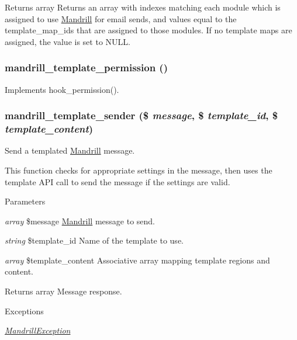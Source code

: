 \begin{DoxyReturn}{Returns}
array Returns an array with indexes matching each module which is assigned to use \hyperlink{classMandrill}{Mandrill} for email sends, and values equal to the template\_\-map\_\-ids that are assigned to those modules. If no template maps are assigned, the value is set to NULL. 
\end{DoxyReturn}
\hypertarget{mandrill__template_8module_ae1d3285f08ccd1416a34b0f0c5276c64}{
\subsubsection[{mandrill\_\-template\_\-permission}]{\setlength{\rightskip}{0pt plus 5cm}mandrill\_\-template\_\-permission ()}}
\label{mandrill__template_8module_ae1d3285f08ccd1416a34b0f0c5276c64}
Implements hook\_\-permission(). \hypertarget{mandrill__template_8module_aa9e98789848a212268bd3978937a7c54}{
\subsubsection[{mandrill\_\-template\_\-sender}]{\setlength{\rightskip}{0pt plus 5cm}mandrill\_\-template\_\-sender (\$ {\em message}, \/  \$ {\em template\_\-id}, \/  \$ {\em template\_\-content})}}
\label{mandrill__template_8module_aa9e98789848a212268bd3978937a7c54}
Send a templated \hyperlink{classMandrill}{Mandrill} message.

This function checks for appropriate settings in the message, then uses the template API call to send the message if the settings are valid.


\begin{DoxyParams}{Parameters}
\item[{\em array}]\$message \hyperlink{classMandrill}{Mandrill} message to send. \item[{\em string}]\$template\_\-id Name of the template to use. \item[{\em array}]\$template\_\-content Associative array mapping template regions and content.\end{DoxyParams}
\begin{DoxyReturn}{Returns}
array Message response.
\end{DoxyReturn}

\begin{DoxyExceptions}{Exceptions}
\item[{\em \hyperlink{classMandrillException}{MandrillException}}]\end{DoxyExceptions}
